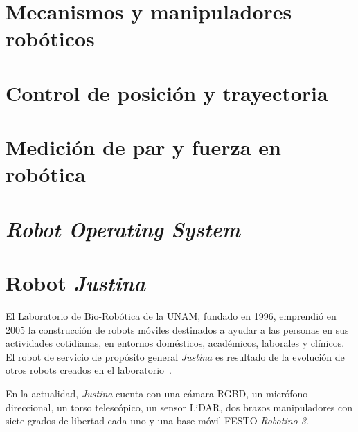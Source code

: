 \section{Mecanismos y manipuladores robóticos}



\section{Control de posición y trayectoria}



\section{Medición de par y fuerza en robótica}



\section{\emph{Robot Operating System}}



\section{Robot \emph{Justina}}

El Laboratorio de Bio-Robótica de la UNAM, fundado en 1996, emprendió en 2005 la construcción de robots móviles destinados a ayudar a las personas en sus actividades cotidianas, en entornos domésticos, académicos, laborales y clínicos. El robot de servicio de propósito general \emph{Justina} es resultado de la evolución de otros robots creados en el laboratorio~\cite{justina_uv}.

En la actualidad, \emph{Justina} cuenta con una cámara RGBD, un micrófono direccional, un torso telescópico, un sensor LiDAR, dos brazos manipuladores con siete grados de libertad cada uno y una base móvil FESTO \emph{Robotino 3}.